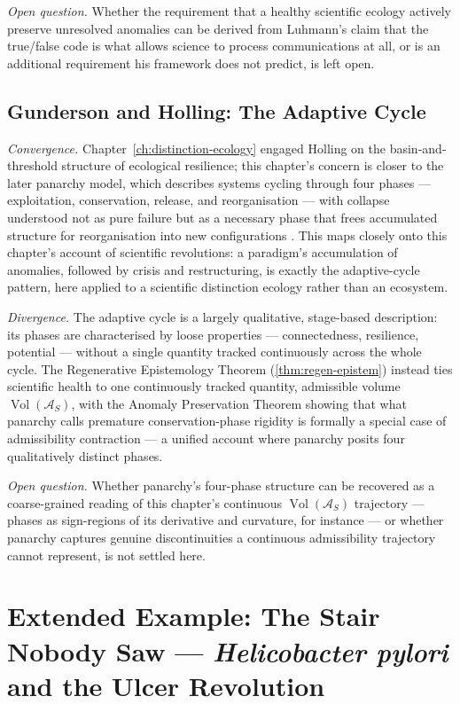 \documentclass[12pt,twoside,openright]{book}
\newcommand{\adm}{\mathcal{A}}
\newcommand{\Vol}{\operatorname{Vol}}
\begin{document}
\emph{Open question.} Whether the requirement that a healthy
scientific ecology actively preserve unresolved anomalies can be
derived from Luhmann's claim that the true/false code is what
allows science to process communications at all, or is an
additional requirement his framework does not predict, is left
open.

\subsection*{Gunderson and Holling: The Adaptive Cycle}

\emph{Convergence.} Chapter~\ref{ch:distinction-ecology} engaged
Holling on the basin-and-threshold structure of ecological
resilience; this chapter's concern is closer to the later
panarchy model, which describes systems cycling through four
phases --- exploitation, conservation, release, and
reorganisation --- with collapse understood not as pure failure
but as a necessary phase that frees accumulated structure for
reorganisation into new configurations \parencite{gunderson2002}.
This maps closely onto this chapter's account of scientific
revolutions: a paradigm's accumulation of anomalies, followed by
crisis and restructuring, is exactly the adaptive-cycle pattern,
here applied to a scientific distinction ecology rather than an
ecosystem.

\emph{Divergence.} The adaptive cycle is a largely qualitative,
stage-based description: its phases are characterised by loose
properties --- connectedness, resilience, potential --- without a
single quantity tracked continuously across the whole cycle. The
Regenerative Epistemology Theorem (\cref{thm:regen-epistem})
instead ties scientific health to one continuously tracked
quantity, admissible volume $\Vol(\adm_S)$, with the Anomaly
Preservation Theorem showing that what panarchy calls premature
conservation-phase rigidity is formally a special case of
admissibility contraction --- a unified account where panarchy
posits four qualitatively distinct phases.

\emph{Open question.} Whether panarchy's four-phase structure can
be recovered as a coarse-grained reading of this chapter's
continuous $\Vol(\adm_S)$ trajectory --- phases as sign-regions of
its derivative and curvature, for instance --- or whether panarchy
captures genuine discontinuities a continuous admissibility
trajectory cannot represent, is not settled here.


\section{Extended Example: The Stair Nobody Saw ---
\emph{Helicobacter pylori} and the Ulcer Revolution}
\label{sec:ch29-hpylori}
\end{document}
